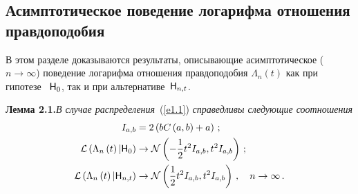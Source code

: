 \begin{multicols}{2}
\section{Асимптотическое поведение логарифма отношения
правдоподобия}

В этом разделе доказываются результаты, описывающие асимптотическое
($n\to\infty$) поведение логарифма отношения правдоподобия
$\Lambda_{n}\left(t\right)$ как при
гипотезе~ ${\sf H}_{0}$, так и при альтернативе~${\sf H}_{n,t}$.

\smallskip

\noindent
\textbf{Лемма 2.1.}{\it В случае распределения}~(\ref{e1.1}) {\it справедливы
следующие соотношения
\begin{align*}
I_{a,b} &=2\left(b C\left(a,b\right)+a\right)\,;\\
{\cal L}\left(\Lambda_{n} \left(t\right)|{\sf H}_{0} \right) &\to
{\cal N}\left(-\displaystyle\frac{\displaystyle 1\mathstrut}{\displaystyle 2\mathstrut} t^{2} I_{a,b},t^{2} I_{a,b}\right)\,;\\
{\cal L}\left(\Lambda_{n} \left(t\right)|{\sf H}_{n,t} \right) &\to
{\cal N}\left(\displaystyle\frac{\displaystyle 1\mathstrut}{\displaystyle 2\mathstrut} t^{2} I_{a,b} ,t^{2} I_{a,b}\right)\,,\quad n\to\infty\,.
\end{align*}
}

\smallskip


\end{multicols}
